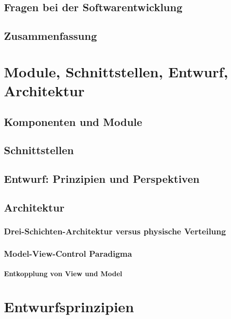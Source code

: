 \documentclass{scrreprt}
\begin{document}
\section{Fragen bei der Softwarentwicklung}
\section{Zusammenfassung}

\chapter{Module, Schnittstellen, Entwurf, Architektur}
\section{Komponenten und Module}

\section{Schnittstellen}

\section{Entwurf: Prinzipien und Perspektiven}

\section{Architektur}
\subsection{Drei-Schichten-Architektur versus physische Verteilung}
\subsection{Model-View-Control Paradigma}
\subsubsection*{Entkopplung von View und Model}

\chapter{Entwurfsprinzipien}
\end{document}
